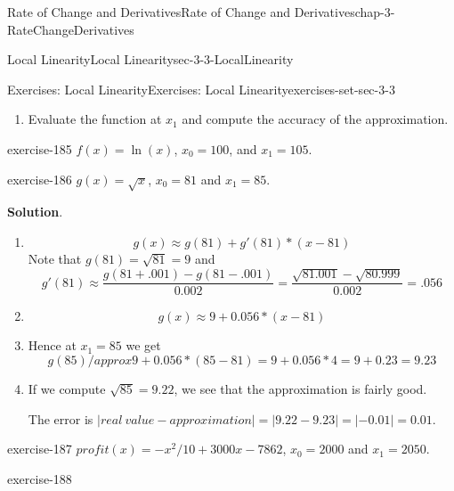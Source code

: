 \documentclass[oneside,10pt,]{book}
\numberwithin{equation}{section}
\begin{document}
\begin{chapterptx}{Rate of Change and Derivatives}{}{Rate of Change and Derivatives}{}{}{chap-3-RateChangeDerivatives}
\begin{sectionptx}{Local Linearity}{}{Local Linearity}{}{}{sec-3-3-LocalLinearity}
\begin{exercises-subsection-numberless}{Exercises: Local Linearity}{}{Exercises: Local Linearity}{}{}{exercises-set-sec-3-3}
\begin{enumerate}[label=(\alph*)]
Evaluate the approximation at \(x_1\).%
\item\hypertarget{li-370}{}\hypertarget{p-1180}{}%
Evaluate the function at \(x_1\) and compute the accuracy of the approximation.%
\end{enumerate}
\begin{exercisegroup}
\begin{divisionexerciseeg}{6}{}{}{exercise-185}%
\hypertarget{p-1181}{}%
\(f(x)=\ln(x)\), \(x_0=100\), and \(x_1=105\).%
\end{divisionexerciseeg}%
\begin{divisionexerciseeg}{7}{}{}{exercise-186}%
\hypertarget{p-1182}{}%
\(g(x)=\sqrt{x}\), \(x_0=81\) and \(x_1=85\).%
\par\smallskip%
\noindent\textbf{Solution}.\hypertarget{solution-92}{}\quad%
\leavevmode%
\begin{enumerate}[label=(\alph*)]
\item\hypertarget{li-371}{}%
\begin{equation*}
g(x)\approx g(81)+g'(81)*(x-81)
\end{equation*}
\hypertarget{p-1183}{}%
Note that \(g(81)=\sqrt{81}=9\) and%
%
\begin{equation*}
g'(81)\approx \frac{g(81+.001)-g(81-.001)}{0.002}=  \frac{\sqrt{81.001}-\sqrt{80.999}}{0.002}=.056
\end{equation*}
\item\hypertarget{li-372}{}%
\begin{equation*}
g(x)\approx 9+0.056*(x-81)
\end{equation*}
%
\item\hypertarget{li-373}{}\hypertarget{p-1184}{}%
Hence at \(x_1=85\) we get%
%
\begin{equation*}
g(85)/approx 9+0.056*(85-81)=9+0.056*4=9+0.23=9.23
\end{equation*}
\item\hypertarget{li-374}{}\hypertarget{p-1185}{}%
If we compute \(\sqrt{85}=9.22\), we see that the approximation is fairly good.%
\par
\hypertarget{p-1186}{}%
The error is \(|real\ value-approximation|=|9.22-9.23|=|-0.01|= 0.01\).%
\end{enumerate}
\end{divisionexerciseeg}%
\begin{divisionexerciseeg}{8}{}{}{exercise-187}%
\hypertarget{p-1187}{}%
\(profit(x)=-x^2/10+3000x-7862\), \(x_0=2000\) and \(x_1=2050\).%
\end{divisionexerciseeg}%
\begin{divisionexerciseeg}{9}{}{}{exercise-188}%

\end{divisionexerciseeg}
\end{exercisegroup}
\end{exercises-subsection-numberless}
\end{sectionptx}
\end{chapterptx}
\end{document}
